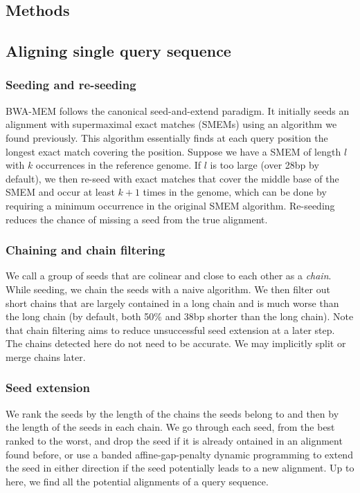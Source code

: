 \documentclass{bioinfo}
\begin{document}
\begin{methods}

\section{Methods}

\subsection{Aligning single query sequence}

\subsubsection{Seeding and re-seeding} BWA-MEM follows the canonical
seed-and-extend paradigm. It initially seeds an alignment with supermaximal
exact matches (SMEMs) using an algorithm we found previously. This algorithm
essentially finds at each query position the longest exact match covering the
position. Suppose we have a SMEM of length $l$ with $k$ occurrences in the
reference genome. If $l$ is too large (over 28bp by default), we then re-seed
with exact matches that cover the middle base of the SMEM and occur at least
$k+1$ times in the genome, which can be done by requiring a minimum occurrence
in the original SMEM algorithm. Re-seeding reduces the chance of missing a seed
from the true alignment.

\subsubsection{Chaining and chain filtering} We call a group of seeds that are
colinear and close to each other as a \emph{chain}. While seeding, we chain
the seeds with a naive algorithm. We then filter out short chains that are
largely contained in a long chain and is much worse than the long chain (by
default, both 50\% and 38bp shorter than the long chain). Note that chain
filtering aims to reduce unsuccessful seed extension at a later step. The
chains detected here do not need to be accurate. We may implicitly split or
merge chains later.

\subsubsection{Seed extension} We rank the seeds by the length of the chains
the seeds belong to and then by the length of the seeds in each chain. We go
through each seed, from the best ranked to the worst, and drop the seed if it
is already ontained in an alignment found before, or use a banded
affine-gap-penalty dynamic programming to extend the seed in either direction
if the seed potentially leads to a new alignment. Up to here, we find all
the potential alignments of a query sequence.


\end{methods}
\end{document}
